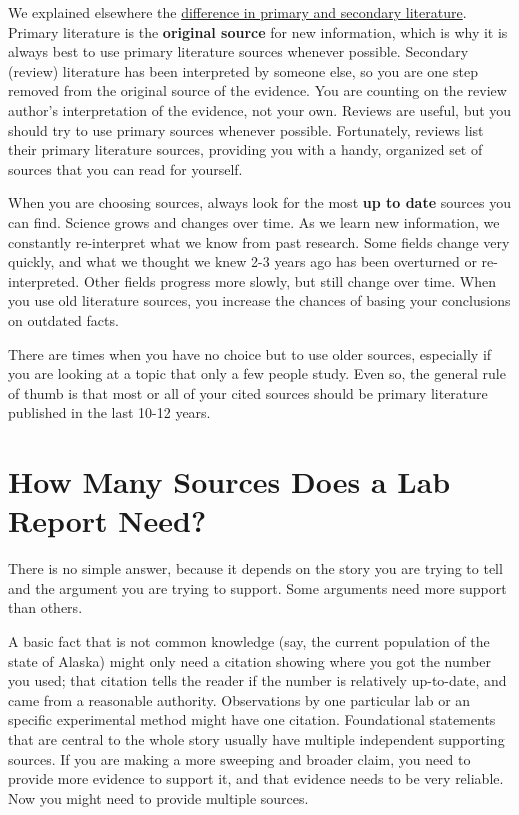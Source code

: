 \documentclass[
]{book}
\begin{document}
We explained elsewhere the \protect\hyperlink{goals100}{difference in primary and secondary literature}. Primary literature is the \textbf{original source} for new information, which is why it is always best to use primary literature sources whenever possible. Secondary (review) literature has been interpreted by someone else, so you are one step removed from the original source of the evidence. You are counting on the review author's interpretation of the evidence, not your own. Reviews are useful, but you should try to use primary sources whenever possible. Fortunately, reviews list their primary literature sources, providing you with a handy, organized set of sources that you can read for yourself.

When you are choosing sources, always look for the most \textbf{up to date} sources you can find. Science grows and changes over time. As we learn new information, we constantly re-interpret what we know from past research. Some fields change very quickly, and what we thought we knew 2-3 years ago has been overturned or re-interpreted. Other fields progress more slowly, but still change over time. When you use old literature sources, you increase the chances of basing your conclusions on outdated facts.

There are times when you have no choice but to use older sources, especially if you are looking at a topic that only a few people study. Even so, the general rule of thumb is that most or all of your cited sources should be primary literature published in the last 10-12 years.

\hypertarget{how-many-sources-does-a-lab-report-need}{%
\section{How Many Sources Does a Lab Report Need?}\label{how-many-sources-does-a-lab-report-need}}

There is no simple answer, because it depends on the story you are trying to tell and the argument you are trying to support. Some arguments need more support than others.

A basic fact that is not common knowledge (say, the current population of the state of Alaska) might only need a citation showing where you got the number you used; that citation tells the reader if the number is relatively up-to-date, and came from a reasonable authority. Observations by one particular lab or an specific experimental method might have one citation. Foundational statements that are central to the whole story usually have multiple independent supporting sources. If you are making a more sweeping and broader claim, you need to provide more evidence to support it, and that evidence needs to be very reliable. Now you might need to provide multiple sources.
\end{document}
